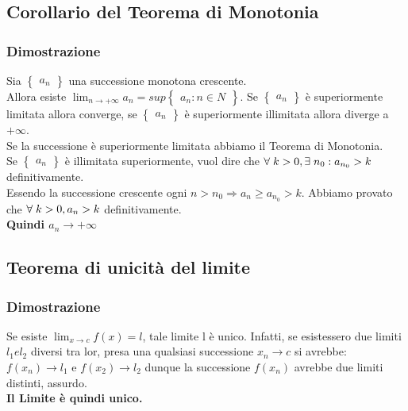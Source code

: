 \documentclass[11pt, a4paper]{article}
\begin{document}
\subsection{Corollario del Teorema di Monotonia}
\subsubsection*{Dimostrazione}
Sia $\left\{\begin{array}{l}a_n\end{array}\right\}$ una successione monotona crescente.\\ Allora esiste $\lim_{n\to+\infty}a_n=sup\left\{\begin{array}{l}a_n : n \in N \end{array}\right\}$. Se $\left\{\begin{array}{l}a_n\end{array}\right\}$ è superiormente limitata allora converge, se $\left\{\begin{array}{l}a_n\end{array}\right\}$ è superiormente illimitata allora diverge a $+\infty$.\\
Se la successione è superiormente limitata abbiamo il Teorema di Monotonia.\\
Se $\left\{\begin{array}{l}a_n\end{array}\right\}$ è illimitata superiormente, vuol dire che $\forall\hspace{0.1cm}k>0, \exists\hspace{0.1cm} n_0 : a_{n_0}>k$ definitivamente.\\ Essendo la successione crescente ogni $n>n_0 \Longrightarrow a_n \geq a_{n_0}>k$. Abbiamo provato che $\forall\hspace{0.1cm}k>0, a_n>k$ definitivamente.\\
\textbf{Quindi $a_n \rightarrow +\infty$}

\subsection{Teorema di unicità del limite}
\subsubsection*{Dimostrazione}
Se esiste $\lim_{x\to c}f(x)=l$, tale limite l è unico. Infatti, se esistessero due limiti $l_1 e l_2$ diversi tra lor, presa una qualsiasi successione $x_n\rightarrow c$ si avrebbe: $f(x_n)\rightarrow l_1$ e $f(x_2)\rightarrow l_2$ dunque la successione $f(x_n)$ avrebbe due limiti distinti, assurdo.\\
\textbf{Il Limite è quindi unico.}
\end{document}
